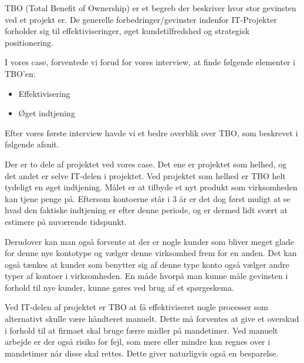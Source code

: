 TBO (Total Benefit of Ownership) er et begreb der beskriver hvor stor gevinsten
ved et projekt er. De generelle forbedringer/gevinster indenfor IT-Projekter
forholder sig til effektiviseringer, øget kundetilfredshed og strategisk
positionering.

I vores case, forventede vi forud for vores interview, at finde følgende elementer i TBO'en:

\begin{itemize}
  \item Effektivisering
  \item Øget indtjening
\end{itemize}

Efter vores første interview havde vi et bedre overblik over TBO, som beskrevet
i følgende afsnit.

Der er to dele af projektet ved vores case. Det ene er projektet som helhed, og
det andet er selve IT-delen i projektet. Ved projektet som helhed er TBO helt
tydeligt en øget indtjening. Målet er at tilbyde et nyt produkt som virksomheden
kan tjene penge på. Eftersom kontoerne står i 3 år er det dog først muligt at
se hvad den faktiske indtjening er efter denne periode, og er dermed lidt svært
at estimere på nuværende tidspunkt.

Derudover kan man også forvente at der er nogle kunder som bliver meget glade
for denne nye kontotype og vælger denne virksomhed frem for en anden. Det kan
også tænkes at kunder som benytter sig af denne type konto også vælger andre
typer af kontoer i virksomheden. En måde hvorpå man kunne måle gevinsten i
forhold til nye kunder, kunne gøres ved brug af et spørgeskema.

Ved IT-delen af projektet er TBO at få effektiviseret nogle processer som
alternativt skulle være håndteret manuelt. Dette må forventes at give et
overskud i forhold til at firmaet skal bruge færre midler på mandetimer. Ved
manuelt arbejde er der også risiko for fejl, som mere eller mindre kan regnes
over i mandetimer når disse skal rettes. Dette giver naturligvis også en
besparelse.
